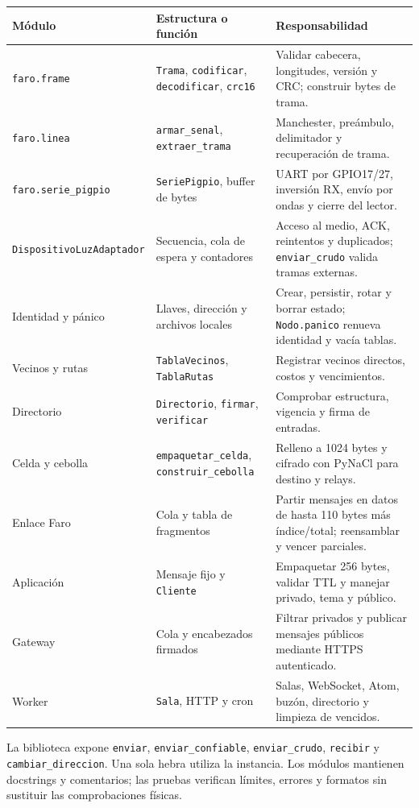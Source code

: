 \documentclass[11pt,letterpaper]{article}
\begin{document}
{\small
\begin{longtable}{P{3.5cm} P{4.1cm} P{5.5cm}}
\toprule
Módulo & Estructura o función & Responsabilidad\\
\midrule\endhead
\texttt{faro.frame} & \texttt{Trama}, \texttt{codificar}, \texttt{decodificar}, \texttt{crc16} & Validar cabecera, longitudes, versión y CRC; construir bytes de trama.\\
\texttt{faro.linea} & \texttt{armar\_senal}, \texttt{extraer\_trama} & Manchester, preámbulo, delimitador y recuperación de trama.\\
\texttt{faro.serie\_pigpio} & \texttt{SeriePigpio}, buffer de bytes & UART por GPIO17/27, inversión RX, envío por ondas y cierre del lector.\\
\texttt{DispositivoLuz\allowbreak{}Adaptador} & Secuencia, cola de espera y contadores & Acceso al medio, ACK, reintentos y duplicados; \texttt{enviar\_crudo} valida tramas externas.\\
Identidad y pánico & Llaves, dirección y archivos locales & Crear, persistir, rotar y borrar estado; \texttt{Nodo.panico} renueva identidad y vacía tablas.\\
Vecinos y rutas & \texttt{TablaVecinos}, \texttt{TablaRutas} & Registrar vecinos directos, costos y vencimientos.\\
Directorio & \texttt{Directorio}, \texttt{firmar}, \texttt{verificar} & Comprobar estructura, vigencia y firma de entradas.\\
Celda y cebolla & \texttt{empaquetar\_celda}, \texttt{construir\_cebolla} & Relleno a 1024 bytes y cifrado con PyNaCl para destino y relays.\\
Enlace Faro & Cola y tabla de fragmentos & Partir mensajes en datos de hasta 110 bytes más índice/total; reensamblar y vencer parciales.\\
Aplicación & Mensaje fijo y \texttt{Cliente} & Empaquetar 256 bytes, validar TTL y manejar privado, tema y público.\\
Gateway & Cola y encabezados firmados & Filtrar privados y publicar mensajes públicos mediante HTTPS autenticado.\\
Worker & \texttt{Sala}, HTTP y cron & Salas, WebSocket, Atom, buzón, directorio y limpieza de vencidos.\\
\bottomrule
\end{longtable}}

La biblioteca expone \texttt{enviar}, \texttt{enviar\_confiable},
\texttt{enviar\_crudo}, \texttt{recibir} y \texttt{cambiar\_direccion}.
Una sola hebra utiliza la instancia. Los módulos mantienen docstrings y
comentarios; las pruebas verifican límites, errores y formatos sin sustituir
las comprobaciones físicas.
\end{document}

